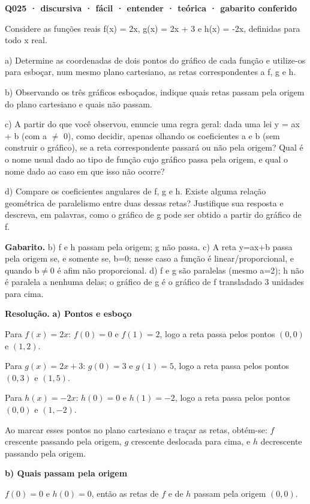 \documentclass[11pt,a4paper]{article}
\begin{document}
\bigskip\noindent\textbf{Q025 · discursiva · fácil · entender · teórica · gabarito conferido}\par\nopagebreak
Considere as funções reais f(x) = 2x, g(x) = 2x + 3 e h(x) = -2x, definidas para todo x real.

a) Determine as coordenadas de dois pontos do gráfico de cada função e utilize-os para esboçar, num mesmo plano cartesiano, as retas correspondentes a f, g e h.

b) Observando os três gráficos esboçados, indique quais retas passam pela origem do plano cartesiano e quais não passam.

c) A partir do que você observou, enuncie uma regra geral: dada uma lei y = ax + b (com a $\neq$ 0), como decidir, apenas olhando os coeficientes a e b (sem construir o gráfico), se a reta correspondente passará ou não pela origem? Qual é o nome usual dado ao tipo de função cujo gráfico passa pela origem, e qual o nome dado ao caso em que isso não ocorre?

d) Compare os coeficientes angulares de f, g e h. Existe alguma relação geométrica de paralelismo entre duas dessas retas? Justifique sua resposta e descreva, em palavras, como o gráfico de g pode ser obtido a partir do gráfico de f.

\textbf{Gabarito.} b) f e h passam pela origem; g não passa. c) A reta y=ax+b passa pela origem se, e somente se, b=0; nesse caso a função é linear/proporcional, e quando b$\neq$0 é afim não proporcional. d) f e g são paralelas (mesmo a=2); h não é paralela a nenhuma delas; o gráfico de g é o gráfico de f transladado 3 unidades para cima.

\textbf{Resolução.} \textbf{a) Pontos e esboço}

Para $f(x)=2x$: $f(0)=0$ e $f(1)=2$, logo a reta passa pelos pontos $(0,0)$ e $(1,2)$.

Para $g(x)=2x+3$: $g(0)=3$ e $g(1)=5$, logo a reta passa pelos pontos $(0,3)$ e $(1,5)$.

Para $h(x)=-2x$: $h(0)=0$ e $h(1)=-2$, logo a reta passa pelos pontos $(0,0)$ e $(1,-2)$.

Ao marcar esses pontos no plano cartesiano e traçar as retas, obtém-se: $f$ crescente passando pela origem, $g$ crescente deslocada para cima, e $h$ decrescente passando pela origem.

\textbf{b) Quais passam pela origem}

$f(0)=0$ e $h(0)=0$, então as retas de $f$ e de $h$ passam pela origem $(0,0)$.
\end{document}
